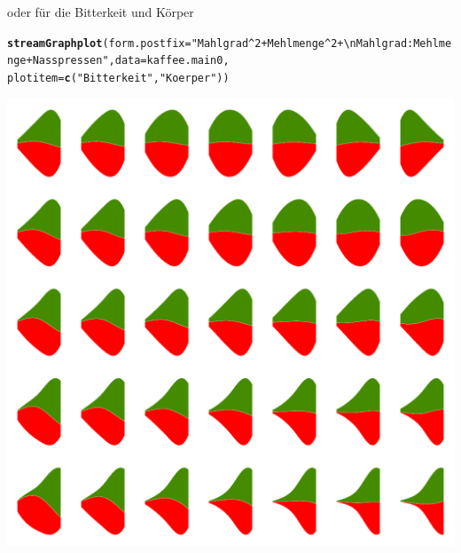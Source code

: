 \documentclass[a4paper]{report}\usepackage{graphicx, color}
\makeatletter
\def\maxwidth{ %
  \ifdim\Gin@nat@width>\linewidth
    \linewidth
  \else
    \Gin@nat@width
  \fi
}
\newcommand{\hlfunctioncall}[1]{\textcolor[rgb]{0.501960784313725,0,0.329411764705882}{\textbf{#1}}}%
\newcommand{\hlstring}[1]{\textcolor[rgb]{0.6,0.6,1}{#1}}%
\newenvironment{kframe}{%
 \def\at@end@of@kframe{}%
 \ifinner\ifhmode%
  \def\at@end@of@kframe{\end{minipage}}%
  \begin{minipage}{\columnwidth}%
 \fi\fi%
 \def\FrameCommand##1{\hskip\@totalleftmargin \hskip-\fboxsep
 \colorbox{shadecolor}{##1}\hskip-\fboxsep
     \hskip-\linewidth \hskip-\@totalleftmargin \hskip\columnwidth}%
 \MakeFramed {\advance\hsize-\width
   \@totalleftmargin\z@ \linewidth\hsize
   \@setminipage}}%
 {\par\unskip\endMakeFramed%
 \at@end@of@kframe}
\newenvironment{knitrout}{}{} %
\makeatother
\begin{document}
\newpage
oder f\"ur die Bitterkeit und K\"orper
\begin{knitrout}
\color{fgcolor}\begin{kframe}
\begin{alltt}
\hlfunctioncall{streamGraphplot}(form.postfix = \hlstring{"Mahlgrad^2+Mehlmenge^2+\textbackslash{}nMahlgrad:Mehlmenge+Nasspressen"}, data = kaffee.main0, 
    plotitem = \hlfunctioncall{c}(\hlstring{"Bitterkeit"}, \hlstring{"Koerper"}))
\end{alltt}
\end{kframe}

{\centering \includegraphics[width=\maxwidth]{./plot_bitandkoe} 

}



\end{knitrout}
\end{document}
